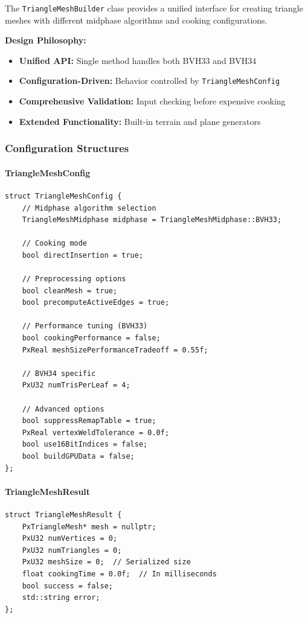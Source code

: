 The \texttt{TriangleMeshBuilder} class provides a unified interface for creating triangle meshes with different midphase algorithms and cooking configurations.

\textbf{Design Philosophy:}
\begin{itemize}
    \item \textbf{Unified API:} Single method handles both BVH33 and BVH34
    \item \textbf{Configuration-Driven:} Behavior controlled by \texttt{TriangleMeshConfig}
    \item \textbf{Comprehensive Validation:} Input checking before expensive cooking
    \item \textbf{Extended Functionality:} Built-in terrain and plane generators
\end{itemize}

\subsubsection{Configuration Structures}

\paragraph{TriangleMeshConfig}

\begin{lstlisting}[caption={TriangleMeshConfig structure}]
struct TriangleMeshConfig {
    // Midphase algorithm selection
    TriangleMeshMidphase midphase = TriangleMeshMidphase::BVH33;

    // Cooking mode
    bool directInsertion = true;

    // Preprocessing options
    bool cleanMesh = true;
    bool precomputeActiveEdges = true;

    // Performance tuning (BVH33)
    bool cookingPerformance = false;
    PxReal meshSizePerformanceTradeoff = 0.55f;

    // BVH34 specific
    PxU32 numTrisPerLeaf = 4;

    // Advanced options
    bool suppressRemapTable = true;
    PxReal vertexWeldTolerance = 0.0f;
    bool use16BitIndices = false;
    bool buildGPUData = false;
};
\end{lstlisting}

\paragraph{TriangleMeshResult}

\begin{lstlisting}[caption={TriangleMeshResult structure}]
struct TriangleMeshResult {
    PxTriangleMesh* mesh = nullptr;
    PxU32 numVertices = 0;
    PxU32 numTriangles = 0;
    PxU32 meshSize = 0;  // Serialized size
    float cookingTime = 0.0f;  // In milliseconds
    bool success = false;
    std::string error;
};
\end{lstlisting}

